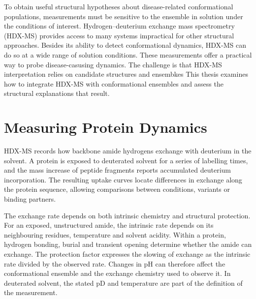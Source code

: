 To obtain useful structural hypotheses about disease-related conformational populations, measurements must be sensitive to the ensemble in solution under the conditions of interest. Hydrogen--deuterium exchange mass spectrometry (HDX-MS) provides access to many systems impractical for other structural approaches.\supercite{jamesAdvancesHydrogenDeuterium2022} Besides its ability to detect conformational dynamics, HDX-MS can do so at a wide range of solution conditions.\supercite{skinnerProteinHydrogenExchange2012} These measurements offer a practical way to probe disease-casusing dynamics. The challenge is that HDX-MS interpretation relies on candidate structures and ensembkes This thesis examines how to integrate HDX-MS with conformational ensembles and assess the structural explanations that result.

\section{Measuring Protein Dynamics}
\label{sec:intro-measurement}

HDX-MS records how backbone amide hydrogens exchange with deuterium in the solvent. A protein is exposed to deuterated solvent for a series of labelling times, and the mass increase of peptide fragments reports accumulated deuterium incorporation.\supercite{massonOverviewHydrogenDeuterium2017,jamesAdvancesHydrogenDeuterium2022} The resulting uptake curves locate differences in exchange along the protein sequence, allowing comparisons between conditions, variants or binding partners.

The exchange rate depends on both intrinsic chemistry and structural protection. For an exposed, unstructured amide, the intrinsic rate depends on its neighbouring residues, temperature and solvent acidity.\supercite{baiPrimaryStructureEffects1993} Within a protein, hydrogen bonding, burial and transient opening determine whether the amide can exchange. The protection factor expresses the slowing of exchange as the intrinsic rate divided by the observed rate.\supercite{skinnerProteinHydrogenExchange2012} Changes in pH can therefore affect the conformational ensemble and the exchange chemistry used to observe it. In deuterated solvent, the stated pD and temperature are part of the definition of the measurement.

